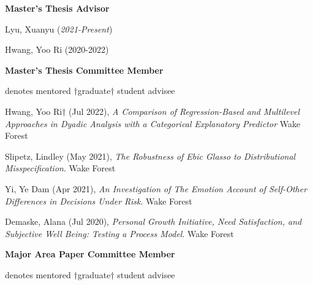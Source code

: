 {\large\textbf{Master's Thesis Advisor}}
\begin{etaremune}%
\item Lyu, Xuanyu  (\textit{2021-Present})
\item Hwang, Yoo Ri (2020-2022)
\end{etaremune}%

%
{\large\textbf{Master's Thesis Committee Member}}
\vspace{-1mm}\begin{center}\footnotesize{denotes mentored $\dagger$graduate$\dagger$ student advisee}\end{center}\vspace{-2mm}
\begin{etaremune}%
\item Hwang, Yoo Ri$\dagger$ (Jul 2022), \textit{A Comparison of Regression-Based and Multilevel Approaches in Dyadic Analysis with a Categorical Explanatory Predictor } Wake Forest%
\item  Slipetz, Lindley (May 2021), \textit{The Robustness of Ebic Glasso to Distributional Misspecification}. Wake Forest
\item Yi, Ye Dam (Apr 2021), \textit{An Investigation of The Emotion Account of Self-Other Differences in Decisions Under Risk}. Wake Forest
\item Demaske, Alana (Jul 2020), \textit{Personal Growth Initiative, Need Satisfaction, and Subjective Well Being: Testing a Process Model}. Wake Forest%
\end{etaremune}%
%
{\large\textbf{Major Area Paper Committee Member}}
\vspace{-1mm}\begin{center}\footnotesize{denotes mentored $\dagger$graduate$\dagger$ student advisee}\end{center}\vspace{-2mm}
